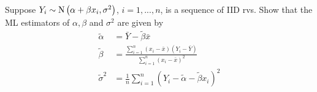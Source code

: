 \documentclass[notoc,notitlepage]{tufte-book}
\begin{document}
\begin{eg}
  Suppose $Y_i \sim \operatorname{N}\left( \alpha + \beta x_i, \sigma^2 \right)$, $i= 1, ..., n$, is a sequence of IID rvs. Show that the ML estimators of $\alpha, \beta$ and $\sigma^2$ are given by
  \begin{align*}
    \tilde{\alpha} &= \bar{Y} - \tilde{\beta} \bar{x} \\
    \tilde{\beta} &= \frac{\sum\limits_{i=1}^{n} (x_i - \bar{x})(Y_i - \bar{Y})}{\sum\limits_{i=1}^{n} (x_i - \bar{x})^2} \\
    \tilde{\sigma}^2 &= \frac{1}{n} \sum_{i=1}^{n} \left(Y_i - \tilde{\alpha} - \tilde{\beta}x_i\right)^2
  \end{align*}
\end{eg}
\end{document}
